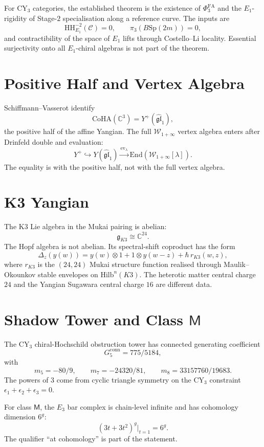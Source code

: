 \documentclass[11pt]{article}
\providecommand{\C}{\mathbb{C}}
\providecommand{\Sp}{\mathrm{Sp}}
\providecommand{\CoHA}{\mathrm{CoHA}}
\providecommand{\fg}{\mathfrak{g}}
\providecommand{\fgl}{\mathfrak{gl}}
\providecommand{\Phifa}{\Phi^{\mathrm{FA}}}
\providecommand{\HH}{\mathrm{HH}}
\providecommand{\cC}{\mathcal{C}}
\theoremstyle{plain}
\theoremstyle{definition}
\theoremstyle{remark}
\begin{document}
For CY$_3$ categories, the established theorem is the existence of
$\Phifa_3$ and the $E_1$-rigidity of Stage-$2$ specialisation along a
reference curve.  The inputs are
\[
  \HH^{-2}_{E_1}(\cC)=0,\qquad \pi_3(B\Sp(2m))=0,
\]
and contractibility of the space of $E_1$ lifts through
Costello--Li locality.  Essential surjectivity onto all
$E_1$-chiral algebras is not part of the theorem.

\section{Positive Half and Vertex Algebra}

Schiffmann--Vasserot identify
\[
  \CoHA(\C^3)=Y^+(\widehat{\fgl}_1),
\]
the positive half of the affine Yangian.  The full
$\mathcal W_{1+\infty}$ vertex algebra enters after Drinfeld double
and evaluation:
\[
  Y^+ \hookrightarrow Y(\widehat{\fgl}_1)
  \xrightarrow{\mathrm{ev}_\lambda}
  \mathrm{End}(\mathcal W_{1+\infty}[\lambda]).
\]
The equality is with the positive half, not with the full vertex
algebra.

\section{K3 Yangian}

The K3 Lie algebra in the Mukai pairing is abelian:
\[
  \fg_{K3}\cong \C^{24}.
\]
The Hopf algebra is not abelian.  Its spectral-shift coproduct has the
form
\[
  \Delta_z(y(w))=
  y(w)\otimes 1+1\otimes y(w-z)+\hbar\, r_{K3}(w,z),
\]
where $r_{K3}$ is the $(24,24)$ Mukai structure function realised
through Maulik--Okounkov stable envelopes on $\mathrm{Hilb}^n(K3)$.
The heterotic matter central charge $24$ and the Yangian Sugawara
central charge $16$ are different data.

\section{Shadow Tower and Class \texorpdfstring{$\mathsf M$}{M}}

The CY$_3$ chiral-Hochschild obstruction tower has connected
generating coefficient
\[
  G_5^{\mathrm{conn}}=775/5184,
\]
with
\[
  m_5=-80/9,\qquad
  m_7=-24320/81,\qquad
  m_8=33157760/19683.
\]
The powers of $3$ come from cyclic triangle symmetry on the
CY$_3$ constraint $\epsilon_1+\epsilon_2+\epsilon_3=0$.

For class $\mathsf M$, the $E_3$ bar complex is chain-level infinite
and has cohomology dimension $6^g$:
\[
  (3t+3t^2)^g\big|_{t=1}=6^g.
\]
The qualifier ``at cohomology'' is part of the statement.
\end{document}
